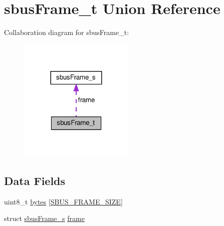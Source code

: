 \hypertarget{unionsbusFrame__t}{\section{sbus\+Frame\+\_\+t Union Reference}
\label{unionsbusFrame__t}
}


Collaboration diagram for sbus\+Frame\+\_\+t\+:\nopagebreak
\begin{figure}[H]
\begin{center}
\leavevmode
\includegraphics[width=156pt]{unionsbusFrame__t__coll__graph}
\end{center}
\end{figure}
\subsection*{Data Fields}
\begin{DoxyCompactItemize}
\item 
uint8\+\_\+t \hyperlink{unionsbusFrame__t_a4f0f33886d3b03bf1bbca2fe1ca2bc9e}{bytes} \mbox{[}\hyperlink{sbus_8c_a52f9a3a2bf446dbaf5f46770d6376727}{S\+B\+U\+S\+\_\+\+F\+R\+A\+M\+E\+\_\+\+S\+I\+Z\+E}\mbox{]}
\item 
struct \hyperlink{structsbusFrame__s}{sbus\+Frame\+\_\+s} \hyperlink{unionsbusFrame__t_ae77562fad30e0768066b591e7bc5e8f1}{frame}
\end{DoxyCompactItemize}


